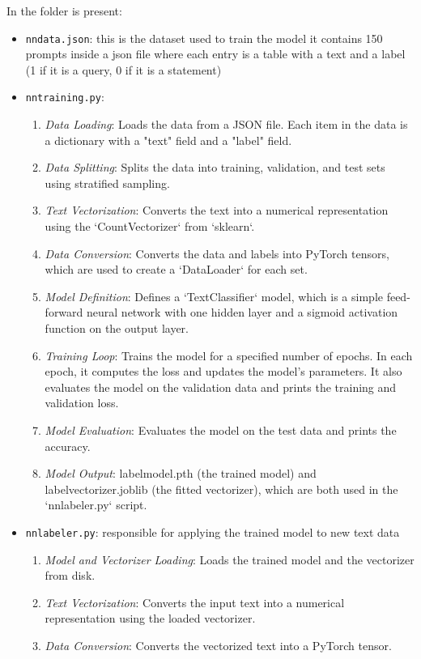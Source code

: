 \documentclass{article}
\begin{document}
In the folder is present:
\begin{itemize}
 \item \texttt{nndata.json}: this is the dataset used to train the model it contains 150 prompts inside a json file where each entry is a table with a text and a label (1 if it is a query, 0 if it is a statement)
  \item \texttt{nntraining.py}:
  \begin{enumerate}
    \item \textit{Data Loading}: Loads the data from a JSON file. Each item in the data is a dictionary with a "text" field and a "label" field.
    \item \textit{Data Splitting}: Splits the data into training, validation, and test sets using stratified sampling.
    \item \textit{Text Vectorization}: Converts the text into a numerical representation using the `CountVectorizer` from `sklearn`.
    \item \textit{Data Conversion}: Converts the data and labels into PyTorch tensors, which are used to create a `DataLoader` for each set.
    \item \textit{Model Definition}: Defines a `TextClassifier` model, which is a simple feed-forward neural network with one hidden layer and a sigmoid activation function on the output layer.
    \item \textit{Training Loop}: Trains the model for a specified number of epochs. In each epoch, it computes the loss and updates the model's parameters. It also evaluates the model on the validation data and prints the training and validation loss.
    \item \textit{Model Evaluation}: Evaluates the model on the test data and prints the accuracy.
    \item \textit{Model Output}: labelmodel.pth (the trained model) and labelvectorizer.joblib (the fitted vectorizer), which are both used in the `nnlabeler.py` script.
  \end{enumerate}
  \item \texttt{nnlabeler.py}: responsible for applying the trained model to new text data
  \begin{enumerate}
    \item \textit{Model and Vectorizer Loading}: Loads the trained model and the vectorizer from disk.
    \item \textit{Text Vectorization}: Converts the input text into a numerical representation using the loaded vectorizer.
    \item \textit{Data Conversion}: Converts the vectorized text into a PyTorch tensor.

\end{enumerate}
\end{itemize}
\end{document}
